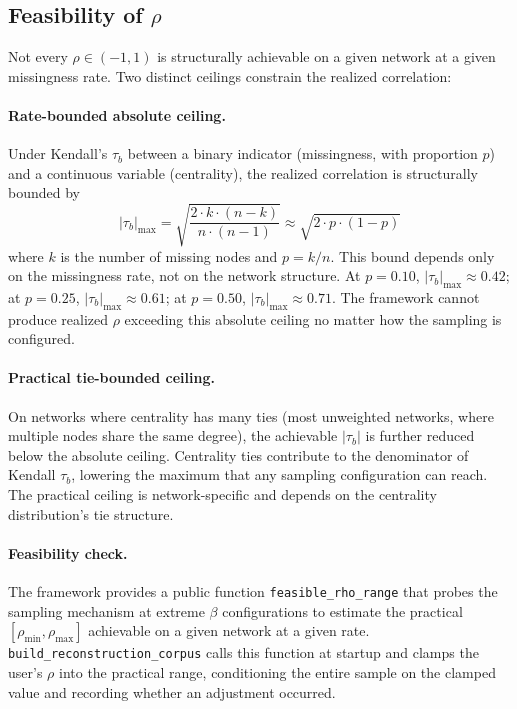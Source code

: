 \documentclass[11pt]{article}
\begin{document}
\subsection{Feasibility of $\rho$}
\label{sec:feasibility}

Not every $\rho \in (-1, 1)$ is structurally achievable on a given network at a given missingness rate. Two distinct ceilings constrain the realized correlation:

\paragraph{Rate-bounded absolute ceiling.} Under Kendall's $\tau_b$ between a binary indicator (missingness, with proportion $p$) and a continuous variable (centrality), the realized correlation is structurally bounded by
\[
|\tau_b|_{\max} = \sqrt{\frac{2 \cdot k \cdot (n - k)}{n \cdot (n - 1)}} \approx \sqrt{2 \cdot p \cdot (1 - p)}
\]
where $k$ is the number of missing nodes and $p = k/n$. This bound depends only on the missingness rate, not on the network structure. At $p = 0.10$, $|\tau_b|_{\max} \approx 0.42$; at $p = 0.25$, $|\tau_b|_{\max} \approx 0.61$; at $p = 0.50$, $|\tau_b|_{\max} \approx 0.71$. The framework cannot produce realized $\rho$ exceeding this absolute ceiling no matter how the sampling is configured.

\paragraph{Practical tie-bounded ceiling.} On networks where centrality has many ties (most unweighted networks, where multiple nodes share the same degree), the achievable $|\tau_b|$ is further reduced below the absolute ceiling. Centrality ties contribute to the denominator of Kendall $\tau_b$, lowering the maximum that any sampling configuration can reach. The practical ceiling is network-specific and depends on the centrality distribution's tie structure.

\paragraph{Feasibility check.} The framework provides a public function \texttt{feasible\_rho\_range} that probes the sampling mechanism at extreme $\beta$ configurations to estimate the practical $[\rho_{\min}, \rho_{\max}]$ achievable on a given network at a given rate. \texttt{build\_reconstruction\_corpus} calls this function at startup and clamps the user's $\rho$ into the practical range, conditioning the entire sample on the clamped value and recording whether an adjustment occurred.
\end{document}
